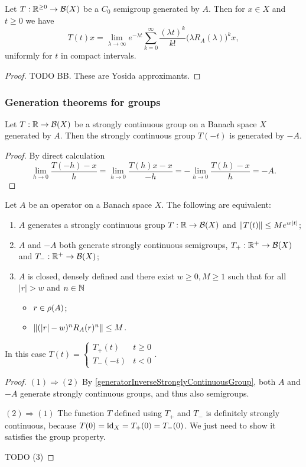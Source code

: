 \begin{proposition}
Let $T: \mathbb{R}^{\geq 0}\to \operatorname{\mathcal{B}}(X)$ be a $C_0$ semigroup generated by $A$. Then for $x\in X$ and $t \geq 0$ we have
\[ T(t)x = \lim_{\lambda\to\infty}e^{-\lambda t}\sum_{k=0}^\infty \frac{(\lambda t)^k}{k!}\big(\lambda R_A(\lambda)\big)^kx, \]
uniformly for $t$ in compact intervals.
\end{proposition}
\begin{proof}
TODO BB. These are Yosida approximants.
\end{proof}

\subsubsection{Generation theorems for groups}
\begin{lemma} \label{generatorInverseStronglyContinuousGroup}
Let $T: \mathbb{R}\to \operatorname{\mathcal{B}}(X)$ be a strongly continuous group on a Banach space $X$ generated by $A$. Then the strongly continuous group $T(-t)$ is generated by $-A$.
\end{lemma}
\begin{proof}
By direct calculation
\[ \lim_{h\to 0} \frac{T(-h) - x}{h} = \lim_{h\to 0} \frac{T(h)x - x}{-h} = -\lim_{h\to 0} \frac{T(h) - x}{h} = -A. \]
\end{proof}

\begin{proposition}
Let $A$ be an operator on a Banach space $X$. The following are equivalent:
\begin{enumerate}
\item $A$ generates a strongly continuous group $T: \mathbb{R}\to \operatorname{\mathcal{B}}(X)$ and $\lVert T(t)\rVert \leq Me^{w |t|}$;
\item $A$ and $-A$ both generate strongly continuous semigroups, $T_+: \mathbb{R}^+\to \operatorname{\mathcal{B}}(X)$ and $T_-: \mathbb{R}^+\to \operatorname{\mathcal{B}}(X)$;
\item $A$ is closed, densely defined and there exist $w\geq 0, M\geq 1$ such that for all $|r|>w$ and $n\in \mathbb{N}$
\begin{itemize}
\item $r\in \rho(A)$;
\item $\lVert(|r|-w)^nR_A(r)^n\rVert \leq M$.
\end{itemize}

\end{enumerate}
In this case $T(t) = \begin{cases}
T_+(t) & t \geq 0 \\ T_-(-t) & t<0
\end{cases}$.
\end{proposition}
\begin{proof}
$(1) \Rightarrow (2)$ By \ref{generatorInverseStronglyContinuousGroup}, both $A$ and $-A$ generate strongly continuous groups, and thus also semigroups.

$(2) \Rightarrow (1)$ The function $T$ defined using $T_+$ and $T_-$ is definitely strongly continuous, because $T(0) = \operatorname{id}_X = T_+(0) = T_-(0)$. We just need to show it satisfies the group property.

TODO (3)
\end{proof}

